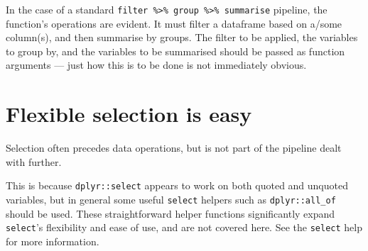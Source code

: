 \documentclass[]{book}
\newenvironment{Shaded}{}{}
\newcommand{\CommentTok}[1]{\textcolor[rgb]{0.38,0.63,0.69}{\textit{#1}}}
\newcommand{\DataTypeTok}[1]{\textcolor[rgb]{0.56,0.13,0.00}{#1}}
\newcommand{\KeywordTok}[1]{\textcolor[rgb]{0.00,0.44,0.13}{\textbf{#1}}}
\newcommand{\NormalTok}[1]{#1}
\newcommand{\OperatorTok}[1]{\textcolor[rgb]{0.40,0.40,0.40}{#1}}
\newcommand{\StringTok}[1]{\textcolor[rgb]{0.25,0.44,0.63}{#1}}
\begin{document}
\begin{Shaded}
\end{Shaded}

In the case of a standard \texttt{filter\ \%\textgreater{}\%\ group\ \%\textgreater{}\%\ summarise} pipeline, the function's operations are evident. It must filter a dataframe based on a/some column(s), and then summarise by groups. The filter to be applied, the variables to group by, and the variables to be summarised should be passed as function arguments --- just how this is to be done is not immediately obvious.

\hypertarget{flexible-selection-is-easy}{%
\section{Flexible selection is easy}\label{flexible-selection-is-easy}}

Selection often precedes data operations, but is not part of the pipeline dealt with further.

This is because \texttt{dplyr::select} appears to work on both quoted and unquoted variables, but in general some useful \texttt{select} helpers such as \texttt{dplyr::all\_of} should be used. These straightforward helper functions significantly expand \texttt{select}'s flexibility and ease of use, and are not covered here. See the \texttt{select} help for more information.
\end{document}
